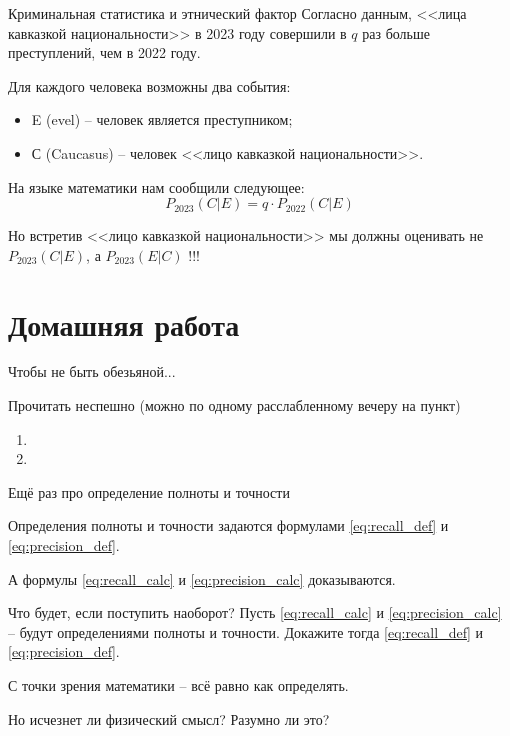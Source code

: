 \begin{frame}[fragile,t]{Криминальная статистика и этнический фактор}
\footnotesize
Согласно данным, <<лица кавказкой национальности>> в 2023 году совершили 
в $q$ раз больше преступлений, чем в 2022 году.

	
Для каждого человека возможны два события:
\begin{itemize}
	\item E (evel) -- человек является преступником;
	\item С (Caucasus) -- человек <<лицо кавказкой национальности>>.
\end{itemize}

На языке математики нам сообщили следующее:
\begin{equation}
P_{2023}(C|E) = q \cdot P_{2022}(C|E)
\end{equation}

Но встретив <<лицо кавказкой национальности>> мы должны оценивать 
не $P_{2023}(C|E)$, а $P_{2023}(E|C)$ !!!

	
\end{frame}


\section{Домашняя работа}

\begin{frame}{Чтобы не быть обезьяной...}
	
Прочитать неспешно
(можно по одному расслабленному вечеру на пункт)
\begin{enumerate}
	\item {}
	\item {}
\end{enumerate}

\end{frame}



\begin{frame}{Ещё раз про определение полноты и точности}
	
	Определения полноты и точности задаются формулами  \eqref{eq:recall_def} и \eqref{eq:precision_def}.
	
	А формулы \eqref{eq:recall_calc} и \eqref{eq:precision_calc}
	доказываются.
	
	Что будет, если поступить наоборот? 
	Пусть \eqref{eq:recall_calc} и \eqref{eq:precision_calc} -- будут определениями
	полноты и точности. 
	Докажите тогда  \eqref{eq:recall_def} и \eqref{eq:precision_def}.
	
	С точки зрения математики -- всё равно как определять.
	
	Но исчезнет ли физический смысл? Разумно ли это?
	
\end{frame}


